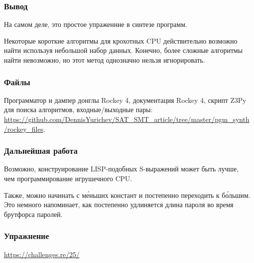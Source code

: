 \subsubsection{Вывод}

На самом деле, это простое упраженние в синтезе программ.

Некоторые короткие алгоритмы для крохотных \ac{CPU} действительно возможно найти используя небольшой набор данных.
Конечно, более сложные алгоритмы найти невозможно,
но этот метод однозначно нельзя игнорировать.

\subsubsection{Файлы}

Программатор и дампер донглы Rockey 4, документация Rockey 4, скрипт Z3Py для поиска алгоритмов, входные/выходные пары:
\url{https://github.com/DennisYurichev/SAT_SMT_article/tree/master/pgm_synth/rockey_files}.

\subsubsection{Дальнейшая работа}

Возможно, конструирование LISP-подобных S-выражений может быть лучше, чем программирование игрушечного CPU.

Также, можно начинать с м\'{е}ньших констант и постепенно переходить к б\'{о}льшим.
Это немного напоминает, как постепенно удлиняется длина пароля во время брутфорса паролей.

\subsubsection{Упражнение}

\url{https://challenges.re/25/}

